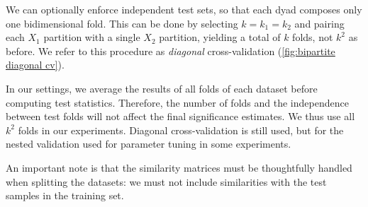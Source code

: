 


We can optionally enforce independent test sets, so that each dyad composes only one bidimensional fold. This can be done by selecting $k=k_1=k_2$ and pairing each $X_1$ partition with a single $X_2$ partition, yielding a total of $k$ folds, not $k^2$ as before.
We refer to this procedure as \emph{diagonal} cross-validation (\autoref{fig:bipartite diagonal cv}).

In our settings, we average the results of all folds of each dataset before computing test statistics. Therefore, the number of folds and the independence between test folds will not affect the final significance estimates. We thus use all $k^2$ folds in our experiments. Diagonal cross-validation is still used, but for the nested validation used for parameter tuning in some experiments.

An important note is that the similarity matrices must be thoughtfully handled when splitting the datasets: we must not include similarities with the test samples in the training set.  %

